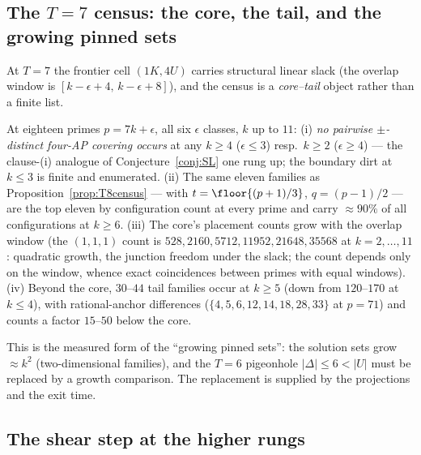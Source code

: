 \subsection{The \texorpdfstring{$T=7$}{T=7} census: the core, the tail, and the growing pinned sets}

At $T=7$ the frontier cell $(1K,4U)$ carries structural linear slack
(the overlap window is $[k-\epsilon+4,\,k-\epsilon+8]$), and the census
is a \emph{core--tail} object rather than a finite list.

\begin{proposition}[the $T=7$ census; machine]\label{prop:T7census}
At eighteen primes $p=7k+\epsilon$, all six $\epsilon$ classes, $k$ up
to $11$: (i) \emph{no pairwise $\pm$-distinct four-AP covering occurs}
at any $k\ge4$ ($\epsilon\le3$) resp.\ $k\ge2$ ($\epsilon\ge4$) --- the
clause-(i) analogue of Conjecture~\ref{conj:SL} one rung up; the
boundary dirt at $k\le3$ is finite and enumerated. (ii) The same eleven
families as Proposition~\ref{prop:T8census} --- with
$t=\floor{(p+1)/3}$, $q=(p-1)/2$ --- are the top eleven by
configuration count at every prime and carry $\approx90\%$ of all
configurations at $k\ge6$. (iii) The core's placement counts grow with
the overlap window (the $(1,1,1)$ count is
$528,2160,5712,11952,21648,35568$ at $k=2,\dots,11$: quadratic growth,
the junction freedom under the slack; the count depends only on the
window, whence exact coincidences between primes with equal windows).
(iv) Beyond the core, $30$--$44$ tail families occur at $k\ge5$ (down
from $120$--$170$ at $k\le4$), with rational-anchor differences
($\{4,5,6,12,14,18,28,33\}$ at $p=71$) and counts a factor $15$--$50$
below the core.
\end{proposition}

This is the measured form of the ``growing pinned sets'': the solution
sets grow $\approx k^2$ (two-dimensional families), and the $T=6$
pigeonhole $|\Delta|\le6<|U|$ must be replaced by a growth comparison.
The replacement is supplied by the projections and the exit time.

\subsection{The shear step at the higher rungs}

